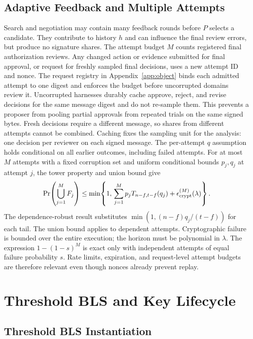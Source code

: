 \documentclass{article}
\begin{document}
\subsection{Adaptive Feedback and Multiple Attempts}
\label{app:retries}

Search and negotiation may contain many feedback rounds before $P$ selects
a candidate. They contribute to history $h$ and can influence the final
review errors, but produce no signature shares. The attempt budget $M$ counts
registered final authorization reviews. Any changed action or evidence
submitted for final approval, or request for freshly sampled final decisions,
uses a new attempt ID and nonce. The request registry in
Appendix~\ref{app:object} binds each admitted attempt to one digest and enforces
the budget before uncorrupted domains review it. Uncorrupted harnesses durably
cache approve, reject, and revise decisions for the same message digest and
do not re-sample them. This prevents a proposer from pooling partial approvals
from repeated trials on the same signed bytes. Fresh decisions require a
different message, so shares from different attempts cannot be combined.
Caching fixes the sampling unit for the analysis: one decision per reviewer
on each signed message. The per-attempt $q$ assumption holds conditional on
all earlier outcomes, including failed attempts.
For at most $M$ attempts with a fixed corruption set and uniform conditional
bounds $p_j,q_j$ at attempt $j$, the tower property and union bound give
\[
 \Pr\!\left(\bigcup_{j=1}^{M}F_j\right)
 \le \min\!\left\{1,\,
 \sum_{j=1}^{M}p_jT_{n-f,t-f}(q_j)
 +\epsilon_{\rm crypt}^{(M)}(\lambda)\right\}.
\]
The dependence-robust result substitutes $\min(1,(n-f)q_j/(t-f))$ for each
tail. The union bound applies to dependent attempts. Cryptographic failure is
bounded over the entire execution; the horizon must be polynomial in $\lambda$.
The expression $1-(1-s)^M$ is exact only with independent attempts of equal
failure probability $s$. Rate limits, expiration, and request-level attempt
budgets are therefore relevant even though nonces already prevent replay.

\FloatBarrier

\section{Threshold BLS and Key Lifecycle}
\label{app:lifecycle}

\subsection{Threshold BLS Instantiation}
\label{app:bls}
\end{document}
